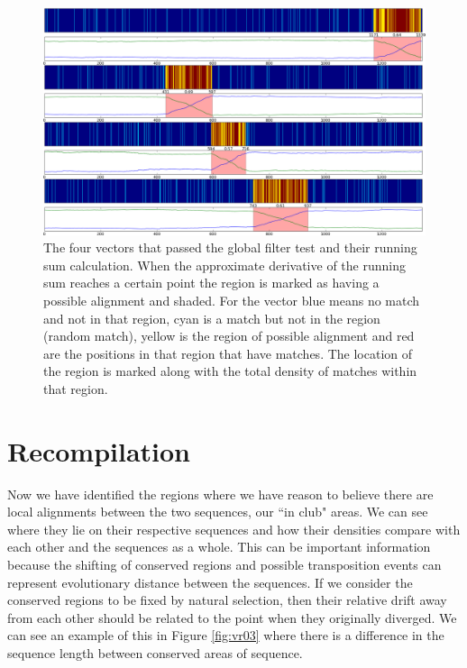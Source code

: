 \documentclass[phd,tocprelim]{cornell}
\begin{document}
 \begin{figure}[htp]%
 \centerline{\includegraphics[width=\textwidth]{figures/velvetrope/localAlignmentsCDF.png}}
 \caption[Second Velvetrope filter]{The four vectors that passed the global filter test and their running sum calculation. When the approximate derivative of the running sum reaches a certain point the region is marked as having a possible alignment and shaded. For the vector blue means no match and not in that region, cyan is a match but not in the region (random match), yellow is the region of possible alignment and red are the positions in that region that have matches. The location of the region is marked along with the total density of matches within that region.}
 	\label{fig:vr02}
 \end{figure}

\section{Recompilation}

Now we have identified the regions where we have reason to believe there are local alignments between the two sequences, our ``in club" areas. We can see where they lie on their respective sequences and how their densities compare with each other and the sequences as a whole. This can be important information because the shifting of conserved regions and possible transposition events can represent evolutionary distance between the sequences. If we consider the conserved regions to be fixed by natural selection, then their relative drift away from each other should be related to the point when they originally diverged. We can see an example of this in Figure \ref{fig:vr03} where there is a difference in the sequence length between conserved areas of sequence.
\end{document}
